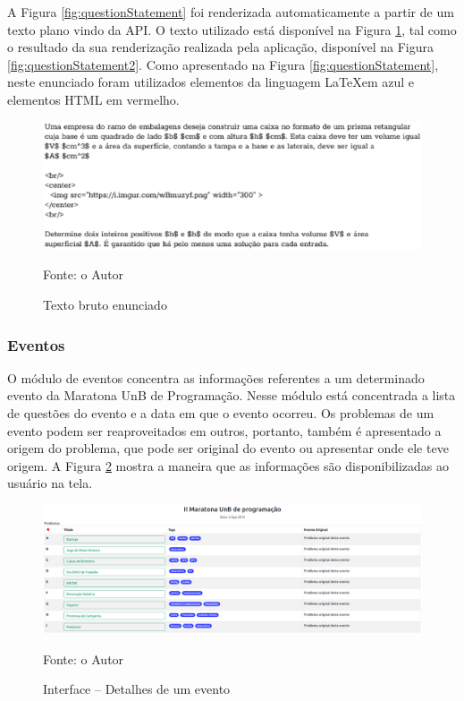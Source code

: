 A Figura \ref{fig:questionStatement} foi renderizada automaticamente a partir de um texto plano vindo da API. O texto utilizado está disponível na Figura \ref{fig:statementText}, tal como o resultado da sua renderização realizada pela aplicação, disponível na Figura \ref{fig:questionStatement2}. Como apresentado na Figura \ref{fig:questionStatement}, neste enunciado foram utilizados elementos da linguagem \LaTeX em azul e elementos HTML em vermelho.

\begin{figure}[H]
    \centering
    \caption{Texto bruto enunciado}
    \includegraphics[keepaspectratio=true,scale=0.65]{figuras/statementText.eps}
    \label{fig:statementText}

    \medskip
    Fonte: o Autor
    \medskip
\end{figure}

\subsubsection{Eventos}
\label{subsec:eventos}

O módulo de eventos concentra as informações referentes a um determinado evento da Maratona UnB de Programação. Nesse módulo está concentrada a lista de questões do evento e a data em que o evento ocorreu. Os problemas de um evento podem ser reaproveitados em outros, portanto, também é apresentado a origem do problema, que pode ser original do evento ou apresentar onde ele teve origem. A Figura \ref{fig:maratonaUnB} mostra a maneira que as informações são disponibilizadas ao usuário na tela.

\begin{figure}
    \centering
    \caption{Interface -- Detalhes de um evento}
    \includegraphics[keepaspectratio=true,scale=0.23]{figuras/contest2.eps}
    \label{fig:maratonaUnB}
    
    \medskip
    Fonte: o Autor
    \medskip
\end{figure}


